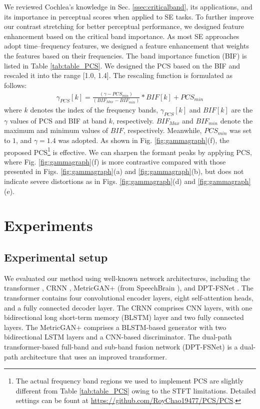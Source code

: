 \documentclass[a4paper]{article}
\begin{document}
We reviewed Cochlea's knowledge in Sec. \ref{ssec:criticalband}, its applications, and its importance in perceptual scores when applied to SE tasks. To further improve our contrast stretching for better perceptual performance, we designed feature enhancement based on the critical band importance. As most SE approaches adopt time–frequency features, we designed a feature enhancement that weights the features based on their frequencies. The band importance function (BIF) \cite{ansi1997s3} is listed in Table \ref{tab:table_PCS}. We designed the PCS based on the BIF and rescaled it into the range [1.0, 1.4]. The rescaling function is formulated as follows:
\begin{equation}
\begin{aligned}
    \gamma_{PCS}[k] =  \frac{( \gamma - PCS_{min} )}{( BIF_{Max} - BIF_{min})}  * BIF[k] + PCS_{min} 
\end{aligned}
\end{equation}
where $k$ denotes the index of the frequency bands, $\gamma_{PCS}[k]$ and $BIF[k]$ are the $\gamma$ values of PCS and BIF at band $k$, respectively. $BIF_{Max}$ and $BIF_{min}$ denote the maximum and minimum values of $BIF$, respectively. Meanwhile, $PCS_{min}$ was set to $1$, and $\gamma = 1.4$ was adopted. As shown in Fig. \ref{fig:gammagraph}(f), the proposed PCS\footnote{The actual frequency band regions we used to implement PCS are slightly different from Table \ref{tab:table_PCS} owing to the STFT limitations. Detailed settings can be fount at \url{https://github.com/RoyChao19477/PCS/PCS}.} is effective. We can sharpen the formant peaks by applying PCS, where Fig. \ref{fig:gammagraph}(f) is more contrastive compared with those presented in Figs. \ref{fig:gammagraph}(a) and \ref{fig:gammagraph}(b), but does not indicate severe distortions as in Figs. \ref{fig:gammagraph}(d) and \ref{fig:gammagraph}(e).


\section{Experiments}
\label{sec:exp}


\subsection{Experimental setup}
\label{ssec:network}

We evaluated our method using well-known network architectures, including the transformer \cite{fu2020boosting}, CRNN \cite{zhao2018convolutional}, MetricGAN+ \cite{fu2021metricgan+} (from SpeechBrain \cite{ravanelli2021speechbrain}), and DPT-FSNet \cite{dang2021dpt}. The transformer contains four convolutional encoder layers, eight self-attention heads, and a fully connected decoder layer. The CRNN comprises CNN layers, with one bidirectional long short-term memory (BLSTM) layer and two fully connected layers. The MetricGAN+ comprises a BLSTM-based generator with two bidirectional LSTM layers and a CNN-based discriminator. The dual-path transformer-based full-band and sub-band fusion network (DPT-FSNet) is a dual-path architecture that uses an improved transformer.
\end{document}
